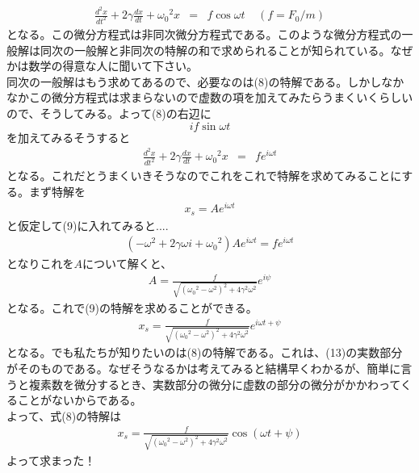 \begin{eqnarray}
\frac{d^2x}{dt^2}+2\gamma \frac{dx}{dt} + {\omega_0}^2 x&=&f\cos{\omega t}\ \ \ \ \ (f = F_0/m)
\end{eqnarray}
となる。この微分方程式は非同次微分方程式である。このような微分方程式の一般解は同次の一般解と非同次の特解の和で求められることが知られている。なぜかは数学の得意な人に聞いて下さい。\\
同次の一般解はもう求めてあるので、必要なのは(8)の特解である。しかしなかなかこの微分方程式は求まらないので虚数の項を加えてみたらうまくいくらしいので、そうしてみる。よって(8)の右辺に
\[
if\sin{\omega t}
\]
を加えてみるそうすると
\begin{eqnarray}
\frac{d^2x}{dt^2}+2\gamma \frac{dx}{dt} + {\omega_0}^2 x&=&fe^{i\omega t}
\end{eqnarray}
となる。これだとうまくいきそうなのでこれをこれで特解を求めてみることにする。まず特解を
\begin{eqnarray}
x_s = Ae^{i\omega t}
\end{eqnarray}
と仮定して(9)に入れてみると....
\begin{eqnarray}
(-\omega^2 +2\gamma \omega i + {\omega_0}^2)Ae^{i\omega t}=fe^{i\omega t}
\end{eqnarray}
となりこれを$A$について解くと、
\begin{eqnarray}
A=\frac{f}{\sqrt{({\omega_0}^2-\omega^2)^2+4\gamma^2\omega^2}}e^{i\psi}
\end{eqnarray}
となる。これで(9)の特解を求めることができる。
\begin{eqnarray}
x_s = \frac{f}{\sqrt{({\omega_0}^2-\omega^2)^2+4\gamma^2\omega^2}}e^{i\omega t +\psi}
\end{eqnarray}
となる。でも私たちが知りたいのは(8)の特解である。これは、(13)の実数部分がそのものである。なぜそうなるかは考えてみると結構早くわかるが、簡単に言うと複素数を微分するとき、実数部分の微分に虚数の部分の微分がかかわってくることがないからである。\\
よって、式(8)の特解は
\begin{eqnarray}
x_s = \frac{f}{\sqrt{({\omega_0}^2-\omega^2)^2+4\gamma^2\omega^2}}\cos(\omega t +\psi)
\label{eq:tokkai}
\end{eqnarray}
よって求まった！
